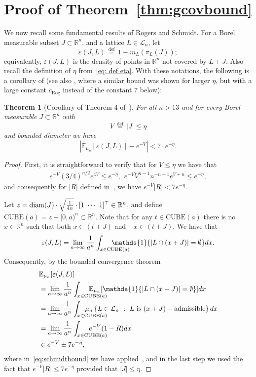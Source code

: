 \documentclass[article,doublecolumn]{IEEEtran}
\newcommand{\EE}{{\mathbb{E}}}
\newcommand{\diam}{{\rm diam}}
\newcommand{\LL}{{\mathcal L}}
\newcommand{\df}{{\, \stackrel{\mathrm{def}}{=}\, }}
\newcommand{\vre}{\varepsilon}
\newcommand{\R}{{\mathbb{R}}}
\newcommand{\crog}{{c_{\mathrm{Rog}}}}
\newcommand{\Ind}{\mathds{1}}
\newtheorem{thm}{Theorem}[section]
\begin{document}
\section{Proof of Theorem~\ref{thm:gcovbound}}
\label{app:tildemubound}
We now recall some fundamental results of Rogers and
Schmidt. For a Borel measurable subset $J \subset \R^n$, and a lattice
$L \in \LL_n$, let
$$\vre(J, L) \df 1-m_L\left(\pi_L(J) \right);$$
equivalently, 
$\vre(J, L)$ is the density of points in $\R^n$ not covered by $L
+J$. Also recall the definition of $\eta$ from~\eqref{eq: def eta}.
With these notations, the following is a corollary of \cite{Schmidt-admissible}
(see also \cite{Rogers_bound}, where a similar bound was shown for larger $\eta$, but with a large constant $\crog$ instead of the constant $7$ below):
\begin{thm}[Corollary of Theorem 4 of~\cite{Schmidt-admissible}]
\label{thm: Rogers bound}
  For all $n >13$ and
  for every Borel measurable $J \subset \R^n$
  with
  $$V \df |J| \leq \eta$$
  and bounded diameter we have
  $$\left|   \EE_{\mu_n}[\vre(J, L)] - e^{-V}
    \right | < 7 \cdot e^{-\eta}.$$  
  \end{thm}

\begin{proof}
First, it is straightforward to verify that for $V\leq \eta$ we have that
\begin{align}
e^{-V}(3/4)^{n/2}e^{4V}\leq e^{-\eta},~~ e^{-V}V^{n-1}n^{-n+1}e^{V+n}\leq e^{-\eta},    
\end{align}
and consequently for $|R|$ defined in~\cite[eq. (3)]{Schmidt-admissible}, we have $e^{-V}|R|<7e^{-\eta}$. 

Let $z=\diam(J)\cdot\sqrt{\frac{1}{4n}}\cdot[1~\cdots ~1]^\top\in\R^n$, and define $\mathrm{CUBE}(a)=z+[0,a)^n\subset\R^n$. Note that for any $t\in \mathrm{CUBE}(a)$ there is no $x\in\R^n$ such that both $x\in (t+J)$ and $-x\in (t+J)$. We have that
\begin{align}
\vre(J, L)=\lim_{a\to\infty}\frac{1}{a^n}\int_{x\in \mathrm{CUBE}(a)}\hspace{-10mm}\Ind\{|L\cap(x+J)|=\emptyset\} dx.    
\end{align}
Consequently, by the bounded convergence theorem
\begin{align}
&\EE_{\mu_n}[\vre(J, L)]\\
&=\lim_{a\to\infty}\frac{1}{a^n}\int_{x\in \mathrm{CUBE}(a)}\hspace{-10mm}\EE_{\mu_n}[\Ind\{|L\cap(x+J)|=\emptyset\}] dx\\
&=\lim_{a\to\infty}\frac{1}{a^n}\int_{x\in \mathrm{CUBE}(a)}\hspace{-12mm}\mu_n\left\{L\in\LL_n~:~L~\text{is}~(x+J)-\text{admissible} \right\} dx\\
&=\lim_{a\to\infty}\frac{1}{a^n}\int_{x\in \mathrm{CUBE}(a)}\hspace{-10mm}e^{-V}(1-R) dx\label{eq:schmidtbound}\\
&\in e^{-V}\pm 7e^{-\eta},
\end{align}
where in~\eqref{eq:schmidtbound} we have applied~\cite[Theorem 4]{Schmidt-admissible}, and in the last step we used the fact that $e^{-V}|R|\leq 7 e^{-\eta}$ provided that $|J|\leq \eta$.
\end{proof}  
\end{document}
